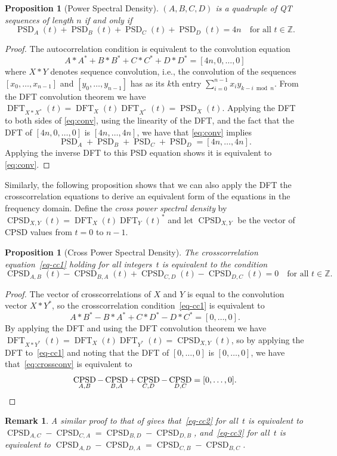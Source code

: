 \documentclass[12pt]{article}
\numberwithin{equation}{section}
\newtheorem{proposition}[theorem]{Proposition}
\newtheorem{remark}[theorem]{Remark}
\DeclareMathOperator{\PSD}{PSD}
\DeclareMathOperator{\CPSD}{CPSD}
\DeclareMathOperator{\DFT}{DFT}
\begin{document}
\begin{proposition}[Power Spectral Density] \label{prop:psd}
$(A, B, C, D)$ is a quadruple of QT sequences of length $n$ if and only if
\[ \PSD_A(t) + \PSD_B(t) + \PSD_C(t) + \PSD_D(t) = 4n \quad\text{for all $t\in\mathbb{Z}$}. \]
\end{proposition}
\begin{proof}
The autocorrelation condition is equivalent to the convolution equation
\begin{equation}
A*A^* + B*B^* + C*C^* + D*D^* = [4n,0,\dotsc,0] \label{eq:conv}
\end{equation}
where $X*Y$ denotes sequence convolution, i.e.,
the convolution of the sequences $[x_0,\dotsc,x_{n-1}]$ and $[y_0,\dotsc,y_{n-1}]$
has as its $k$th entry $\sum_{i=0}^{n-1}x_iy_{k-i\bmod n}$.
From the DFT convolution theorem we have $\DFT_{X*X^*}(t)=\DFT_X(t)\DFT_{X^*}(t)=\PSD_X(t)$.
Applying the DFT to both sides of \eqref{eq:conv}, using the linearity of
the DFT, and the fact that the DFT of $[4n,0,\dotsc,0]$ is $[4n,\dotsc,4n]$, we have that
\eqref{eq:conv} implies
\[ \PSD_A + \PSD_B + \PSD_C + \PSD_D = [4n,\dotsc,4n] . \]
Applying the inverse DFT to this PSD equation shows it is equivalent
to \eqref{eq:conv}.
\end{proof}

Similarly, the following proposition shows that we can also apply the DFT the crosscorrelation
equations to derive an equivalent form of the equations in the frequency domain.
Define the \emph{cross power spectral density} by $\CPSD_{X,Y}(t)=\DFT_X(t)\DFT_Y(t)^*$ and
let $\CPSD_{X,Y}$ be the vector of CPSD values from $t=0$ to $n-1$.

\begin{proposition}[Cross Power Spectral Density]\label{prop:cpsd}
The crosscorrelation equation~\eqref{eq-cc1} holding for all integers\/~$t$ is equivalent to
the condition
\[ \CPSD_{A,B}(t) - \CPSD_{B,A}(t) + \CPSD_{C,D}(t) - \CPSD_{D,C}(t) = 0 \quad\text{for all $t\in\mathbb{Z}$}. \]
\end{proposition}
\begin{proof}
The vector of crosscorrelations of $X$ and $Y$ is equal to the convolution vector
$X*Y^*$, so the crosscorrelation condition~\eqref{eq-cc1} is equivalent to
\begin{equation}
 A*B^*-B*A^*+C*D^*-D*C^* = [0,\dotsc,0] . \label{eq:crossconv}
\end{equation}
By applying the DFT and using the DFT convolution theorem we have
$\DFT_{X*Y^*}(t)=\DFT_X(t)\DFT_{Y^*}(t)=\CPSD_{X,Y}(t)$, so
by applying the DFT to~\eqref{eq-cc1} and noting that the DFT
of $[0,\dotsc,0]$ is $[0,\dotsc,0]$, we have that~\eqref{eq:crossconv} is equivalent
to
\[ \CPSD_{A,B} - \CPSD_{B,A} + \CPSD_{C,D} - \CPSD_{D,C} = [0,\dotsc,0] . \qedhere \]
\end{proof}
\begin{remark}\label{rmk:cpsd}
A similar proof to that of  gives that~\eqref{eq-cc2} for all\/~$t$ is equivalent to
$\CPSD_{A,C} - \CPSD_{C,A} =  \CPSD_{B,D} - \CPSD_{D,B}$,
and~\eqref{eq-cc3} for all\/~$t$ is equivalent to
$\CPSD_{A,D} - \CPSD_{D,A} =  \CPSD_{C,B} - \CPSD_{B,C}$.
\end{remark}
\end{document}
